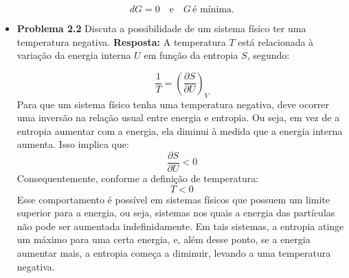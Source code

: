 \documentclass[12pt]{article}
\begin{document}
\begin{itemize}
    \[
    dG = 0 \quad \text{e} \quad G \, \text{é mínima}.
    \]
     \item \textbf{Problema 2.2} Discuta a possibilidade de um sistema físico ter uma temperatura negativa.
     \textbf{Resposta:} A temperatura  \( T \) está relacionada à variação da energia interna \( U \) em função da entropia \( S \), segundo:

\[
\frac{1}{T} = \left( \frac{\partial S}{\partial U} \right)_V
\]
Para que um sistema físico tenha uma temperatura negativa, deve ocorrer uma inversão na relação usual entre energia e entropia. Ou seja, em vez de a entropia aumentar com a energia, ela diminui à medida que a energia interna aumenta. Isso implica que:
     \[
     \frac{\partial S}{\partial U} < 0
     \]
     Consequentemente, conforme a definição de temperatura:
     \[
     T < 0
     \]
     Esse comportamento é possível em sistemas físicos que possuem um limite superior para a energia, ou seja, sistemas nos quais a energia das partículas não pode ser aumentada indefinidamente. Em tais sistemas, a entropia atinge um máximo para uma certa energia, e, além desse ponto, se a energia aumentar mais, a entropia começa a diminuir, levando a uma temperatura negativa.
     

\end{itemize}
\end{document}
